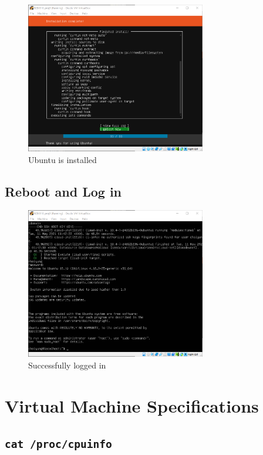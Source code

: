 \documentclass{article}
\begin{document}
\begin{figure}[H]
  \caption{Ubuntu is installed}
  \centering
  \includegraphics[width=0.7\textwidth]{ECE4310_Proj3_1_installing_11.png}
\end{figure}

\subsection{Reboot and Log in}
\begin{figure}[H]
  \caption{Successfully logged in}
  \centering
  \includegraphics[width=0.7\textwidth]{ECE4310_Proj3_1_logged_in.png}
\end{figure}

\section{Virtual Machine Specifications}

\subsection{\texttt{cat /proc/cpuinfo}}
\end{document}
